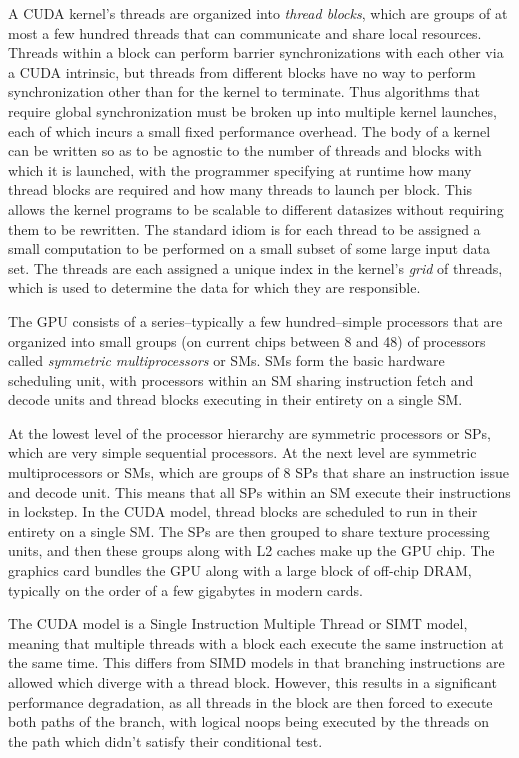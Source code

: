 \documentclass[preprint]{sigplanconf}
\begin{document}
A CUDA kernel's threads are organized into {\it thread blocks}, which are groups
of at most a few hundred threads that can communicate and share local resources.
Threads within a block can perform barrier synchronizations with each other via
a CUDA intrinsic, but threads from different blocks have no way to perform
synchronization other than for the kernel to terminate.  Thus algorithms that
require global synchronization must be broken up into multiple kernel launches,
each of which incurs a small fixed performance overhead.  The body of a
kernel can be written so as to be agnostic to the number of threads and
blocks with which it is launched, with the programmer specifying at runtime how
many thread blocks are required and how many threads to launch per block. This
allows the kernel programs to be scalable to different datasizes without
requiring them to be rewritten. The standard idiom is for each thread to be
assigned a small computation to be performed on a small subset of some large
input data set.  The threads are each assigned a unique index in the kernel's
{\it grid} of threads, which is used to determine the data for which they are
responsible.

The GPU consists of a series--typically a few hundred--simple processors that
are organized into small groups (on current chips between 8 and 48) of
processors called {\it symmetric multiprocessors} or SMs.  SMs form the basic
hardware scheduling unit, with processors within an SM sharing instruction
fetch and decode units and thread blocks executing in their entirety on a
single SM.

At the lowest level of the processor hierarchy are symmetric
processors or SPs, which are very simple sequential processors.  At the
next level are symmetric multiprocessors or SMs, which are groups of 8 SPs that
share an instruction issue and decode unit.  This means that all SPs within an
SM execute their instructions in lockstep.  In the CUDA model, thread blocks are
scheduled to run in their entirety on a single SM.  The SPs are then grouped to
share texture processing units, and then these groups along with L2 caches make
up the GPU chip.  The graphics card bundles the GPU along with a large block of
off-chip DRAM, typically on the order of a few gigabytes in modern cards.

The CUDA model is a Single Instruction Multiple Thread or SIMT model, meaning
that multiple threads with a block each execute the same instruction at the same
time.  This differs from SIMD models in that branching instructions are allowed
which diverge with a thread block.  However, this results in a significant
performance degradation, as all threads in the block are then forced to execute
both paths of the branch, with logical noops being executed by the threads on
the path which didn't satisfy their conditional test.
\end{document}
